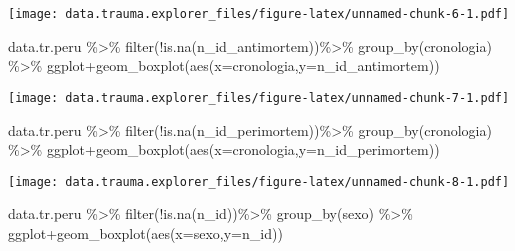 \documentclass[
]{article}
\newenvironment{Shaded}{\begin{snugshade}}{\end{snugshade}}
\newcommand{\AttributeTok}[1]{\textcolor[rgb]{0.77,0.63,0.00}{#1}}
\newcommand{\FunctionTok}[1]{\textcolor[rgb]{0.00,0.00,0.00}{#1}}
\newcommand{\NormalTok}[1]{#1}
\newcommand{\SpecialCharTok}[1]{\textcolor[rgb]{0.00,0.00,0.00}{#1}}
\begin{document}
\texttt{[image: data.trauma.explorer\_files/figure-latex/unnamed-chunk-6-1.pdf]}

\begin{Shaded}
\begin{Highlighting}[]
\NormalTok{data.tr.peru }\SpecialCharTok{\%\textgreater{}\%} \FunctionTok{filter}\NormalTok{(}\SpecialCharTok{!}\FunctionTok{is.na}\NormalTok{(n\_id\_antimortem))}\SpecialCharTok{\%\textgreater{}\%}
                \FunctionTok{group\_by}\NormalTok{(cronologia) }\SpecialCharTok{\%\textgreater{}\%}\NormalTok{ ggplot}\SpecialCharTok{+}\FunctionTok{geom\_boxplot}\NormalTok{(}\FunctionTok{aes}\NormalTok{(}\AttributeTok{x=}\NormalTok{cronologia,}\AttributeTok{y=}\NormalTok{n\_id\_antimortem))}
\end{Highlighting}
\end{Shaded}

\texttt{[image: data.trauma.explorer\_files/figure-latex/unnamed-chunk-7-1.pdf]}

\begin{Shaded}
\begin{Highlighting}[]
\NormalTok{data.tr.peru }\SpecialCharTok{\%\textgreater{}\%} \FunctionTok{filter}\NormalTok{(}\SpecialCharTok{!}\FunctionTok{is.na}\NormalTok{(n\_id\_perimortem))}\SpecialCharTok{\%\textgreater{}\%}
                \FunctionTok{group\_by}\NormalTok{(cronologia) }\SpecialCharTok{\%\textgreater{}\%}\NormalTok{ ggplot}\SpecialCharTok{+}\FunctionTok{geom\_boxplot}\NormalTok{(}\FunctionTok{aes}\NormalTok{(}\AttributeTok{x=}\NormalTok{cronologia,}\AttributeTok{y=}\NormalTok{n\_id\_perimortem))}
\end{Highlighting}
\end{Shaded}

\texttt{[image: data.trauma.explorer\_files/figure-latex/unnamed-chunk-8-1.pdf]}

\begin{Shaded}
\begin{Highlighting}[]
\NormalTok{data.tr.peru }\SpecialCharTok{\%\textgreater{}\%} \FunctionTok{filter}\NormalTok{(}\SpecialCharTok{!}\FunctionTok{is.na}\NormalTok{(n\_id))}\SpecialCharTok{\%\textgreater{}\%}
                \FunctionTok{group\_by}\NormalTok{(sexo) }\SpecialCharTok{\%\textgreater{}\%}\NormalTok{  ggplot}\SpecialCharTok{+}\FunctionTok{geom\_boxplot}\NormalTok{(}\FunctionTok{aes}\NormalTok{(}\AttributeTok{x=}\NormalTok{sexo,}\AttributeTok{y=}\NormalTok{n\_id))}
\end{Highlighting}
\end{Shaded}
\end{document}
